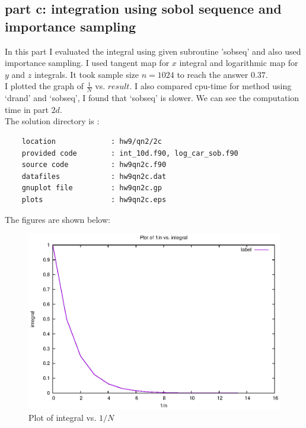 \documentclass[11pt,a4paper,english]{article}
\begin{document}
\subsection{part c: integration using sobol sequence and importance sampling}
In this part I evaluated the integral using given subroutine 'sobseq' and also used
importance sampling. I used tangent map for $x$ integral and logarithmic map
for $y$ and $z$ integrals.
It took sample size $n=1024$ to reach the answer $0.37$.\\
I plotted the graph of $\frac{1}{N}$ vs. $result$.
I also compared cpu-time for method using `drand' and `sobseq', I found that
`sobseq' is slower. We can see the computation time in part $2d$.\\

			The solution directory is :\\
	\begin{verbatim}
	location             : hw9/qn2/2c
	provided code        : int_10d.f90, log_car_sob.f90
	source code          : hw9qn2c.f90
	datafiles            : hw9qn2c.dat
	gnuplot file         : hw9qn2c.gp
	plots                : hw9qn2c.eps
	\end{verbatim}
	
		    The figures are shown below:\\
	\begin{figure}[h!]
	\centering
	\includegraphics [scale=0.6]{figures/hw9qn2c.eps}
	\caption{Plot of integral vs. $1/N$ }
	\end{figure}
	\clearpage

\end{document}
